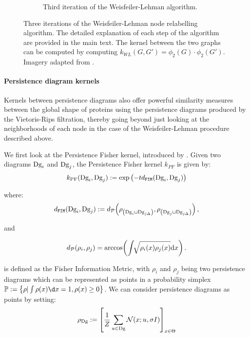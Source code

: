 \begin{figure}
\begin{subfigure}[b]{0.5\textwidth}
    \captionsetup{width=1.4\linewidth}
    \caption{Third iteration of the Weisfeiler-Lehman algorithm.}
  \end{subfigure}
  \caption[Three iterations of the Weisfeiler-Lehman algorithm.]{Three
iterations of the Weisfeiler-Lehman node relabelling algorithm. The detailed
explanation of each step of the algorithm are provided in the main text. The
kernel between the two graphs can be computed by computing
$k_{WL}(G,G')=\phi_2(G)\cdot\phi_2(G')$. Imagery adapted from
\cite{mengin2019}.}
  \label{fig:wl_algo}
\end{figure}

\paragraph{Persistence diagram kernels} Kernels between persistence diagrams
also offer powerful similarity measures between the global shape of proteins
using the persistence diagrams produced by the Vietoris-Rips filtration, thereby
going beyond just looking at the neighborhoods of each node in the case of the
Weisfeiler-Lehman procedure described above.

We first look at the Persistence Fisher kernel, introduced by
\cite{le2018persistence}. Given two diagrams $\textnormal{Dg}_i$ and $\textnormal{Dg}_j$, the Persistence
Fisher kernel $k_{PF}$ is given by:
\begin{equation}
  \label{eq:kpf}
  k_{\text{PF}}(\textnormal{Dg}_i, \textnormal{Dg}_j ) :=\exp\left(-td_{\texttt{FIM}}(\textnormal{Dg}_i,\textnormal{Dg}_j)\right)
\end{equation}

where:
\begin{equation}
  \label{eq:dfim}
  d_{\texttt{FIM}}(\textnormal{Dg}_i, \textnormal{Dg}_j) := d_{\mathcal{P}} \! \left(\rho_{\left(\textnormal{Dg}_i \cup \text{Dg}_{j\Delta}\right)}, \rho_{\left(\textnormal{Dg}_j \cup \text{Dg}_{j\Delta}\right)} \right),
\end{equation}

and

\begin{equation}\label{equ:dFIM}
  d_{\mathcal{P}}(\rho_i, \rho_j) = \arccos \! \left(\int \!\!\sqrt{\rho_i(x) \rho_j(x)} \mathrm{d}x \right).
\end{equation}

is defined as the Fisher Information Metric, with $\rho_i$ and  $\rho_j$ being
two persistence diagrams which can be represented as points in a probability
simplex $\bbp := \left\{ \rho|\int\rho(x)\d x=1,\rho(x)\geq 0\right\}$. We can
consider persistence diagrams as points by setting:
\begin{equation}
  \label{eq:pdsaspoints}
  \rho_{\textnormal{Dg}} := \left[ {1\over Z} \sum_{u\in\textnormal{Dg}}\mathcal{N}(x;u,\sigma I)\right]_{x\in\Theta}
\end{equation}

